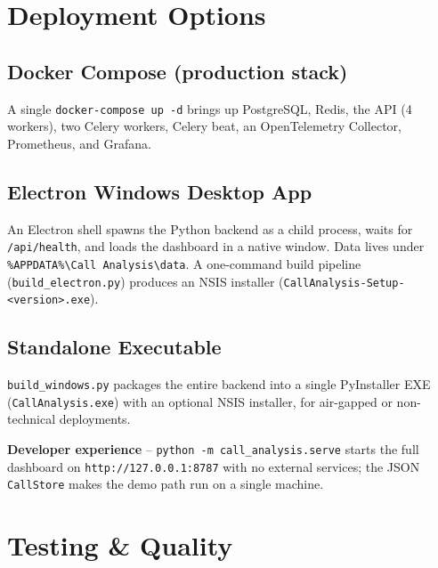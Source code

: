 \documentclass[11pt,a4paper]{article}
\begin{document}
\section{Deployment Options}

\subsection{Docker Compose (production stack)}

A single \texttt{docker-compose up -d} brings up PostgreSQL, Redis, the API (4 workers),
two Celery workers, Celery beat, an OpenTelemetry Collector, Prometheus, and Grafana.

\subsection{Electron Windows Desktop App}

An Electron shell spawns the Python backend as a child process, waits for
\texttt{/api/health}, and loads the dashboard in a native window. Data lives under
\texttt{\%APPDATA\%\textbackslash\allowbreak Call Analysis\textbackslash\allowbreak data}. A one-command build
pipeline (\texttt{build\_electron.py}) produces an NSIS installer
(\texttt{CallAnalysis-Setup-<version>.exe}).

\subsection{Standalone Executable}

\texttt{build\_windows.py} packages the entire backend into a single PyInstaller EXE
(\texttt{CallAnalysis.exe}) with an optional NSIS installer, for air-gapped or
non-technical deployments.

\begin{highlight}
\textbf{Developer experience} -- \texttt{python -m call\_analysis.serve} starts the full
dashboard on \texttt{http://127.0.0.1:8787} with no external services; the JSON
\texttt{CallStore} makes the demo path run on a single machine.
\end{highlight}

\section{Testing \& Quality}
\end{document}
